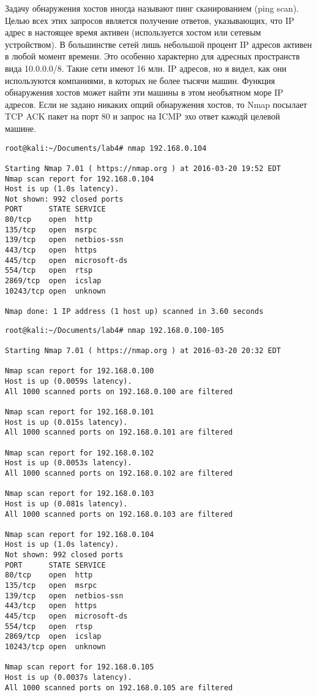 \documentclass[12pt,a4paper]{report}
\author{Nazarova Ksenia}
\begin{document}
Задачу обнаружения хостов иногда называют пинг сканированием (ping scan). Целью всех этих запросов является получение ответов, указывающих, что IP адрес в настоящее время активен (используется хостом или сетевым устройством). В большинстве сетей лишь небольшой процент IP адресов активен в любой момент времени. Это особенно характерно для адресных пространств вида 10.0.0.0/8. Такие сети имеют 16 млн. IP адресов, но я видел, как они используются компаниями, в которых не более тысячи машин. Функция обнаружения хостов может найти эти машины в этом необъятном море IP адресов.
Если не задано никаких опций обнаружения хостов, то Nmap посылает TCP ACK пакет на порт 80 и запрос на ICMP эхо ответ кажодй целевой машине.

\begin{verbatim}
root@kali:~/Documents/lab4# nmap 192.168.0.104

Starting Nmap 7.01 ( https://nmap.org ) at 2016-03-20 19:52 EDT
Nmap scan report for 192.168.0.104
Host is up (1.0s latency).
Not shown: 992 closed ports
PORT      STATE SERVICE
80/tcp    open  http
135/tcp   open  msrpc
139/tcp   open  netbios-ssn
443/tcp   open  https
445/tcp   open  microsoft-ds
554/tcp   open  rtsp
2869/tcp  open  icslap
10243/tcp open  unknown

Nmap done: 1 IP address (1 host up) scanned in 3.60 seconds
\end{verbatim}

\begin{verbatim}
root@kali:~/Documents/lab4# nmap 192.168.0.100-105

Starting Nmap 7.01 ( https://nmap.org ) at 2016-03-20 20:32 EDT

Nmap scan report for 192.168.0.100
Host is up (0.0059s latency).
All 1000 scanned ports on 192.168.0.100 are filtered

Nmap scan report for 192.168.0.101
Host is up (0.015s latency).
All 1000 scanned ports on 192.168.0.101 are filtered

Nmap scan report for 192.168.0.102
Host is up (0.0053s latency).
All 1000 scanned ports on 192.168.0.102 are filtered

Nmap scan report for 192.168.0.103
Host is up (0.081s latency).
All 1000 scanned ports on 192.168.0.103 are filtered

Nmap scan report for 192.168.0.104
Host is up (1.0s latency).
Not shown: 992 closed ports
PORT      STATE SERVICE
80/tcp    open  http
135/tcp   open  msrpc
139/tcp   open  netbios-ssn
443/tcp   open  https
445/tcp   open  microsoft-ds
554/tcp   open  rtsp
2869/tcp  open  icslap
10243/tcp open  unknown

Nmap scan report for 192.168.0.105
Host is up (0.0037s latency).
All 1000 scanned ports on 192.168.0.105 are filtered
\end{verbatim}
\end{document}
